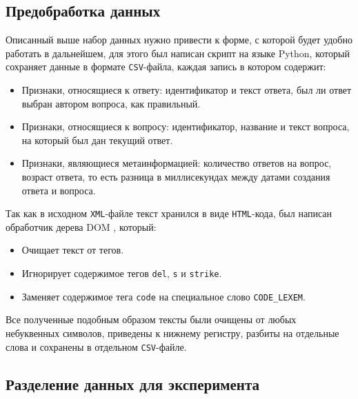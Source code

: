 \documentclass[../diploma.tex]{subfiles}
\begin{document}
	\subsection{Предобработка данных}

	Описанный выше набор данных нужно привести к форме, с которой будет удобно работать в дальнейшем, 
	для этого был написан скрипт на языке Python, который сохраняет данные в формате \texttt{CSV}-файла, каждая запись в котором содержит:
	
	\begin{itemize}

		\item
		Признаки, относящиеся к ответу: идентификатор и текст ответа, был ли ответ выбран автором вопроса, как правильный.

		\item
		Признаки, относящиеся к вопросу: идентификатор, название и текст вопроса, на который был дан текущий ответ.

	    \item
	    Признаки, являющиеся метаинформацией: количество ответов на вопрос, возраст ответа, то есть разница в миллисекундах между датами создания ответа и вопроса.

	\end{itemize}

	Так как в исходном \texttt{XML}-файле текст хранился в виде \texttt{HTML}-кода, был написан обработчик дерева DOM \cite{online:dom}, который:
	\begin{itemize}
	
		\item
		Очищает текст от тегов.

		\item
		Игнорирует содержимое тегов \texttt{del}, \texttt{s} и \texttt{strike}.

		\item
		Заменяет содержимое тега \texttt{code} на специальное слово \texttt{CODE\_LEXEM}.
	
	\end{itemize}

	Все полученные подобным образом тексты были очищены от любых небуквенных символов, приведены к нижнему регистру, разбиты на отдельные слова 
	и сохранены в отдельном \texttt{CSV}-файле.

	\subsection{Разделение данных для эксперимента}
\end{document}
